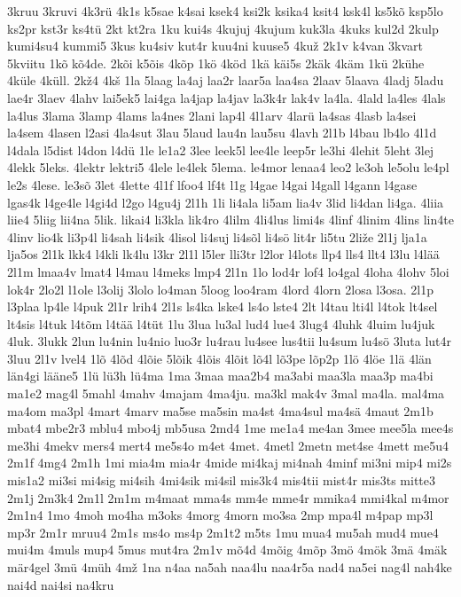 {3kruu
3kruvi
4k3rü
4k1s
k5sae
k4sai
ksek4
ksi2k
ksika4
ksit4
ksk4l
ks5kõ
ksp5lo
ks2pr
kst3r
ks4tü
2kt
kt2ra
1ku
kui4s
4kujuj
4kujum
kuk3la
4kuks
kul2d
2kulp
kumi4su4
kummi5
3kus
ku4siv
kut4r
kuu4ni
kuuse5
4kuž
2k1v
k4van
3kvart
5kviitu
1kõ
kõ4de.
2kõi
k5õis
4kõp
1kö
4köd
1kä
käi5s
2käk
4käm
1kü
2kühe
4küle
4küll.
2kž4
4kš
1la
5laag
la4aj
laa2r
laar5a
laa4sa
2laav
5laava
4ladj
5ladu
lae4r
3laev
4lahv
lai5ek5
lai4ga
la4jap
la4jav
la3k4r
lak4v
la4la.
4lald
la4les
4lals
la4lus
3lama
3lamp
4lams
la4nes
2lani
lap4l
4l1arv
4larü
la4sas
4lasb
la4sei
la4sem
4lasen
l2asi
4la4sut
3lau
5laud
lau4n
lau5su
4lavh
2l1b
l4bau
lb4lo
4l1d
l4dala
l5dist
l4don
l4dü
1le
le1a2
3lee
leek5l
lee4le
leep5r
le3hi
4lehit
5leht
3lej
4lekk
5leks.
4lektr
lektri5
4lele
le4lek
5lema.
le4mor
lenaa4
leo2
le3oh
le5olu
le4pl
le2s
4lese.
le3sõ
3let
4lette
4l1f
lfoo4
lf4t
l1g
l4gae
l4gai
l4gall
l4gann
l4gase
lgas4k
l4ge4le
l4gi4d
l2go
l4gu4j
2l1h
1li
li4ala
li5am
lia4v
3lid
li4dan
li4ga.
4liia
liie4
5liig
lii4na
5lik.
likai4
li3kla
lik4ro
4lilm
4li4lus
limi4s
4linf
4linim
4lins
lin4te
4linv
lio4k
li3p4l
li4sah
li4sik
4lisol
li4suj
li4sõl
li4sö
lit4r
li5tu
2liže
2l1j
lja1a
lja5os
2l1k
lkk4
l4kli
lk4lu
l3kr
2l1l
l5ler
lli3tr
l2lor
l4lots
llp4
lls4
llt4
l3lu
l4lää
2l1m
lmaa4v
lmat4
l4mau
l4meks
lmp4
2l1n
1lo
lod4r
lof4
lo4gal
4loha
4lohv
5loi
lok4r
2lo2l
l1ole
l3olij
3lolo
lo4man
5loog
loo4ram
4lord
4lorn
2losa
l3osa.
2l1p
l3plaa
lp4le
l4puk
2l1r
lrih4
2l1s
ls4ka
lske4
ls4o
lste4
2lt
l4tau
lti4l
l4tok
lt4sel
lt4sis
l4tuk
l4tõm
l4tää
l4tüt
1lu
3lua
lu3al
lud4
lue4
3lug4
4luhk
4luim
lu4juk
4luk.
3lukk
2lun
lu4nin
lu4nio
luo3r
lu4rau
lu4see
lus4tii
lu4sum
lu4sö
3luta
lut4r
3luu
2l1v
lvel4
1lõ
4lõd
4lõie
5lõik
4lõis
4lõit
lõ4l
lõ3pe
lõp2p
1lö
4löe
1lä
4län
län4gi
lääne5
1lü
lü3h
lü4ma
1ma
3maa
maa2b4
ma3abi
maa3la
maa3p
ma4bi
ma1e2
mag4l
5mahl
4mahv
4majam
4ma4ju.
ma3kl
mak4v
3mal
ma4la.
mal4ma
ma4om
ma3pl
4mart
4marv
ma5se
ma5sin
ma4st
4ma4sul
ma4sä
4maut
2m1b
mbat4
mbe2r3
mblu4
mbo4j
mb5usa
2md4
1me
me1a4
me4an
3mee
mee5la
mee4s
me3hi
4mekv
mers4
mert4
me5s4o
m4et
4met.
4metl
2metn
met4se
4mett
me5u4
2m1f
4mg4
2m1h
1mi
mia4m
mia4r
4mide
mi4kaj
mi4nah
4minf
mi3ni
mip4
mi2s
mis1a2
mi3si
mi4sig
mi4sih
4mi4sik
mi4sil
mis3k4
mis4tii
mist4r
mis3ts
mitte3
2m1j
2m3k4
2m1l
2m1m
m4maat
mma4s
mm4e
mme4r
mmika4
mmi4kal
m4mor
2m1n4
1mo
4moh
mo4ha
m3oks
4morg
4morn
mo3sa
2mp
mpa4l
m4pap
mp3l
mp3r
2m1r
mruu4
2m1s
ms4o
ms4p
2m1t2
m5ts
1mu
mua4
mu5ah
mud4
mue4
mui4m
4muls
mup4
5mus
mut4ra
2m1v
mõ4d
4mõig
4mõp
3mö
4mök
3mä
4mäk
mär4gel
3mü
4müh
4mž
1na
n4aa
na5ah
naa4lu
naa4r5a
nad4
na5ei
nag4l
nah4ke
nai4d
nai4si
na4kru
}
